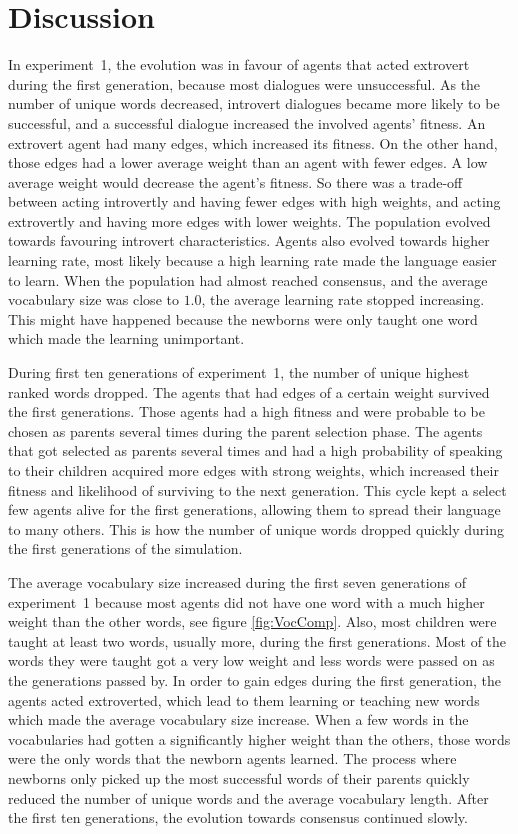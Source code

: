\acresetall
\chapter{Discussion}\label{ch:Discussion}
In experiment~1, the evolution was in favour of agents that acted extrovert during the first generation, because most dialogues were unsuccessful. As the number of unique words decreased, introvert dialogues became more likely to be successful, and a successful dialogue increased the involved agents' fitness. An extrovert agent had many edges, which increased its fitness. On the other hand, those edges had a lower average weight than an agent with fewer edges. A low average weight would decrease the agent's fitness. So there was a trade-off between acting introvertly and having fewer edges with high weights, and acting extrovertly and having more edges with lower weights. The population evolved towards favouring introvert characteristics. Agents also evolved towards higher learning rate, most likely because a high learning rate made the language easier to learn. When the population had almost reached consensus, and the average vocabulary size was close to $1.0$, the average learning rate stopped increasing. This might have happened because the newborns were only taught one word which made the learning unimportant. 

During first ten generations of experiment~1, the number of unique highest ranked words dropped. The agents that had edges of a certain weight survived the first generations. Those agents had a high fitness and were probable to be chosen as parents several times during the parent selection phase. The agents that got selected as parents several times and had a high probability of speaking to their children acquired more edges with strong weights, which increased their fitness and likelihood of surviving to the next generation. This cycle kept a select few agents alive for the first generations, allowing them to spread their language to many others. This is how the number of unique words dropped quickly during the first generations of the simulation. 

The average vocabulary size increased during the first seven generations of experiment~1 because most agents did not have one word with a much higher weight than the other words, see figure \ref{fig:VocComp}. Also, most children were taught at least two words, usually more, during the first generations. Most of the words they were taught got a very low weight and less words were passed on as the generations passed by. In order to gain edges during the first generation, the agents acted extroverted, which lead to them learning or teaching new words which made the average vocabulary size increase. When a few words in the vocabularies had gotten a significantly higher weight than the others, those words were the only words that the newborn agents learned. The process where newborns only picked up the most successful words of their parents quickly reduced the number of unique words and the average vocabulary length. After the first ten generations, the evolution towards consensus continued slowly. 
 
